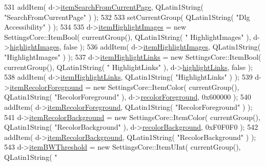 \begin{DoxyCode}
531   addItem( d->\hyperlink{classOkular_1_1SettingsPrivate_aa251d7a638d4cd802c4f69c8e70a3bd4}{itemSearchFromCurrentPage}, QLatin1String( \textcolor{stringliteral}{"SearchFromCurrentPage"} ) 
      );
532 
533   setCurrentGroup( QLatin1String( \textcolor{stringliteral}{"Dlg Accessibility"} ) );
534 
535   d->\hyperlink{classOkular_1_1SettingsPrivate_af3f1a9c4948bb1310b04cb379202d332}{itemHighlightImages} = \textcolor{keyword}{new} SettingsCore::ItemBool( currentGroup(), QLatin1String( \textcolor{stringliteral}{"
      HighlightImages"} ), d->\hyperlink{classOkular_1_1SettingsPrivate_a9c5e6321acc2783dc74d13e212949f06}{highlightImages}, \textcolor{keyword}{false} );
536   addItem( d->\hyperlink{classOkular_1_1SettingsPrivate_af3f1a9c4948bb1310b04cb379202d332}{itemHighlightImages}, QLatin1String( \textcolor{stringliteral}{"HighlightImages"} ) );
537   d->\hyperlink{classOkular_1_1SettingsPrivate_a8591ce945239814a8fa2059d6745285d}{itemHighlightLinks} = \textcolor{keyword}{new} SettingsCore::ItemBool( currentGroup(), QLatin1String( \textcolor{stringliteral}{"
      HighlightLinks"} ), d->\hyperlink{classOkular_1_1SettingsPrivate_a60cd257eee44d96f790c173d05b187b8}{highlightLinks}, \textcolor{keyword}{false} );
538   addItem( d->\hyperlink{classOkular_1_1SettingsPrivate_a8591ce945239814a8fa2059d6745285d}{itemHighlightLinks}, QLatin1String( \textcolor{stringliteral}{"HighlightLinks"} ) );
539   d->\hyperlink{classOkular_1_1SettingsPrivate_a31381738b83f17a0f015465f4757b892}{itemRecolorForeground} = \textcolor{keyword}{new} SettingsCore::ItemColor( currentGroup(), 
      QLatin1String( \textcolor{stringliteral}{"RecolorForeground"} ), d->\hyperlink{classOkular_1_1SettingsPrivate_ac188f8afa6c36f3be06278295ef84d90}{recolorForeground}, 0x600000 );
540   addItem( d->\hyperlink{classOkular_1_1SettingsPrivate_a31381738b83f17a0f015465f4757b892}{itemRecolorForeground}, QLatin1String( \textcolor{stringliteral}{"RecolorForeground"} ) );
541   d->\hyperlink{classOkular_1_1SettingsPrivate_a50f9f6fcd91ced5f63d0790d0a8e62df}{itemRecolorBackground} = \textcolor{keyword}{new} SettingsCore::ItemColor( currentGroup(), 
      QLatin1String( \textcolor{stringliteral}{"RecolorBackground"} ), d->\hyperlink{classOkular_1_1SettingsPrivate_a4b7f7ebb712481217604970532e988f1}{recolorBackground}, 0xF0F0F0 );
542   addItem( d->\hyperlink{classOkular_1_1SettingsPrivate_a50f9f6fcd91ced5f63d0790d0a8e62df}{itemRecolorBackground}, QLatin1String( \textcolor{stringliteral}{"RecolorBackground"} ) );
543   d->\hyperlink{classOkular_1_1SettingsPrivate_ad54cedc7f9a8f1fcf4bac28c00af0e0f}{itemBWThreshold} = \textcolor{keyword}{new} SettingsCore::ItemUInt( currentGroup(), QLatin1String( \textcolor{stringliteral}{"
}
\end{DoxyCode}

